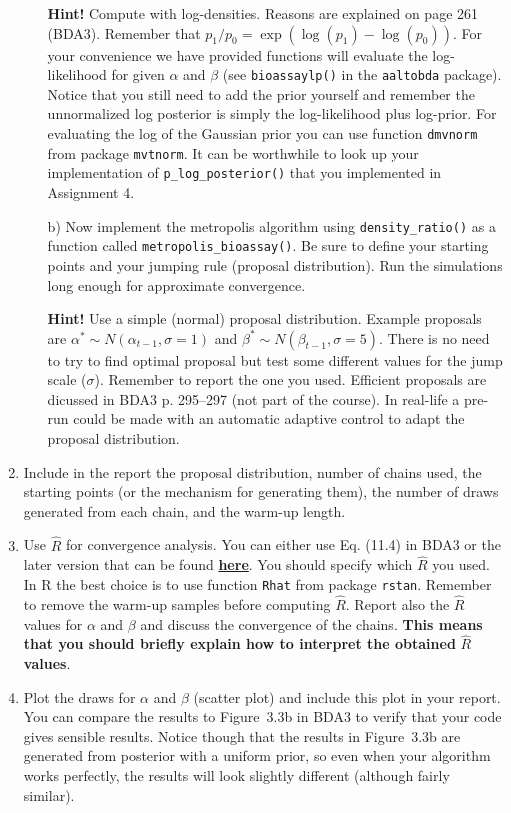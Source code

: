 \documentclass[a4paper,11pt]{article}
\begin{document}
\begin{enumerate}
\begin{itemize}
\textbf{Hint!} Compute with log-densities. Reasons are explained on page 261 (BDA3). Remember that $p_1/p_0=\exp(\log(p_1)-\log(p_0))$. For your convenience we have provided functions will evaluate the log-likelihood for given $\alpha$ and $\beta$ (see {\tt bioassaylp()} in the {\tt aaltobda} package). Notice that you still need to add the prior yourself and remember the unnormalized log posterior is simply the log-likelihood plus log-prior. For evaluating the log of the Gaussian prior you can use function {\tt dmvnorm} from package {\tt mvtnorm}. It can be worthwhile to look up your implementation of {\tt p\_log\_posterior()} that you implemented in Assignment 4.
\item[b)] Now implement the metropolis algorithm using {\tt density\_ratio()} as a function called {\tt metropolis\_bioassay()}. Be sure to define your starting points and your jumping rule (proposal distribution). Run the simulations long enough for approximate convergence. 

\textbf{Hint!} Use a simple (normal) proposal distribution. Example proposals are $\alpha^* \sim N(\alpha_{t-1}, \sigma = 1)$ and $\beta^* \sim N(\beta_{t-1}, \sigma = 5)$. There is no need to try to find optimal proposal but test some different values for the jump scale ($\sigma$). Remember to report the one you used. Efficient proposals are dicussed in BDA3 p. 295--297 (not part of the course). In real-life a pre-run could be made with an automatic adaptive control to adapt the proposal distribution.
\end{itemize}

\item Include in the report the proposal distribution, number of chains used, the starting points (or the mechanism for generating them), the number of draws generated from each chain, and the warm-up length. 

\item Use $\hat{R}$ for convergence analysis. You can either use Eq. (11.4) in BDA3 or the later version that can be found \href{https://arxiv.org/abs/1903.08008}{\textbf{here}}. You should specify which $\hat{R}$ you used. In R the best choice is to use function {\tt Rhat} from package {\tt rstan}. Remember to remove the warm-up samples before computing $\hat R$. Report also the $\hat R$ values for $\alpha$ and $\beta$ and discuss the convergence of the chains.
\textbf{This means that you should briefly explain how to interpret the obtained} $\hat R$ \textbf{values}.

\item Plot the draws for $\alpha$ and $\beta$ (scatter plot) and include this plot in your report. You can compare the results to Figure~3.3b in BDA3 to verify that your code gives sensible results. Notice though that the results in Figure~3.3b are generated from posterior with a uniform prior, so even when your algorithm works perfectly, the results will look slightly different (although fairly similar).

\end{enumerate}
\end{document}
